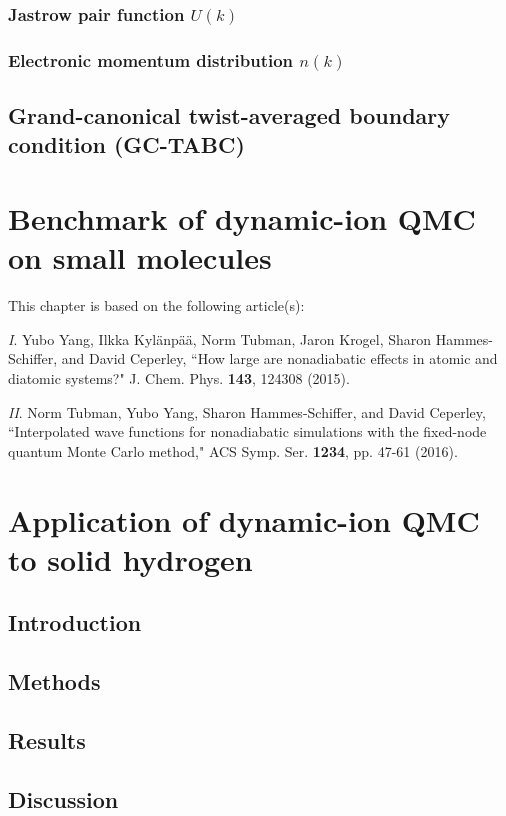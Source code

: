 \documentclass[draftthesis,fullpage]{uiucthesis}
\begin{document}
\subsection{Jastrow pair function $U(k)$}
\subsection{Electronic momentum distribution $n(k)$}
\section{Grand-canonical twist-averaged boundary condition (GC-TABC)}

\chapter{Benchmark of dynamic-ion QMC on small molecules}
This chapter is based on the following article(s):

\textit{I}. Yubo Yang, Ilkka Kyl\"anp\"a\"a, Norm Tubman, Jaron Krogel, Sharon Hammes-Schiffer, and David Ceperley, ``How large are nonadiabatic effects in atomic and diatomic systems?" J. Chem. Phys. \textbf{143}, 124308 (2015).

\textit{II}. Norm Tubman, Yubo Yang, Sharon Hammes-Schiffer, and David Ceperley, ``Interpolated wave functions for nonadiabatic simulations with the fixed-node quantum Monte Carlo method," ACS Symp. Ser. \textbf{1234}, pp. 47-61 (2016).




\chapter{Application of dynamic-ion QMC to solid hydrogen}
\section{Introduction}
\section{Methods}
\section{Results}
\section{Discussion}
\end{document}
